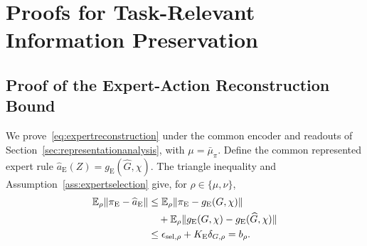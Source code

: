 \section{Proofs for Task-Relevant Information Preservation}
\label{app:representationproofs}

\subsection{Proof of the Expert-Action Reconstruction Bound}
\label{app:expertreconstruction}
We prove~\eqref{eq:expertreconstruction} under the common encoder and readouts of Section~\ref{sec:representationanalysis}, with $\mu=\bar\mu_\pi$.
Define the common represented expert rule $\widehat a_{\mathrm E}(Z)=g_{\mathrm E}(\widehat G,\chi)$.
The triangle inequality and Assumption~\ref{ass:expertselection} give, for $\rho\in\{\mu,\nu\}$,
\begin{equation}
 \begin{aligned}
 \mathbb E_\rho\lVert\pi_{\mathrm E}-\widehat a_{\mathrm E}\rVert
 &\le \mathbb E_\rho\lVert\pi_{\mathrm E}-g_{\mathrm E}(G,\chi)\rVert\\
 &\quad+\mathbb E_\rho\lVert g_{\mathrm E}(G,\chi)-g_{\mathrm E}(\widehat G,\chi)\rVert\\
 &\le\epsilon_{\mathrm{sel},\rho}+K_{\mathrm E}\delta_{G,\rho}
 =b_\rho.
 \end{aligned}
 \label{eq:appexpertreconstruction}
\end{equation}


